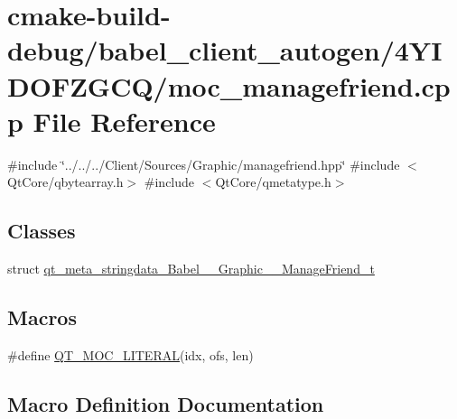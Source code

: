 \hypertarget{cmake-build-debug_2babel__client__autogen_24YIDOFZGCQ_2moc__managefriend_8cpp}{}\section{cmake-\/build-\/debug/babel\+\_\+client\+\_\+autogen/4\+Y\+I\+D\+O\+F\+Z\+G\+C\+Q/moc\+\_\+managefriend.cpp File Reference}
\label{cmake-build-debug_2babel__client__autogen_24YIDOFZGCQ_2moc__managefriend_8cpp}
{\ttfamily \#include \char`\"{}../../../\+Client/\+Sources/\+Graphic/managefriend.\+hpp\char`\"{}}\newline
{\ttfamily \#include $<$Qt\+Core/qbytearray.\+h$>$}\newline
{\ttfamily \#include $<$Qt\+Core/qmetatype.\+h$>$}\newline
\subsection*{Classes}
\begin{DoxyCompactItemize}
\item 
struct \hyperlink{structqt__meta__stringdata__Babel____Graphic____ManageFriend__t}{qt\+\_\+meta\+\_\+stringdata\+\_\+\+Babel\+\_\+\+\_\+\+Graphic\+\_\+\+\_\+\+Manage\+Friend\+\_\+t}
\end{DoxyCompactItemize}
\subsection*{Macros}
\begin{DoxyCompactItemize}
\item 
\#define \hyperlink{cmake-build-debug_2babel__client__autogen_24YIDOFZGCQ_2moc__managefriend_8cpp_a75bb9482d242cde0a06c9dbdc6b83abe}{Q\+T\+\_\+\+M\+O\+C\+\_\+\+L\+I\+T\+E\+R\+AL}(idx,  ofs,  len)
\end{DoxyCompactItemize}


\subsection{Macro Definition Documentation}
\mbox{\label{cmake-build-debug_2babel__client__autogen_24YIDOFZGCQ_2moc__managefriend_8cpp_a75bb9482d242cde0a06c9dbdc6b83abe}} 

